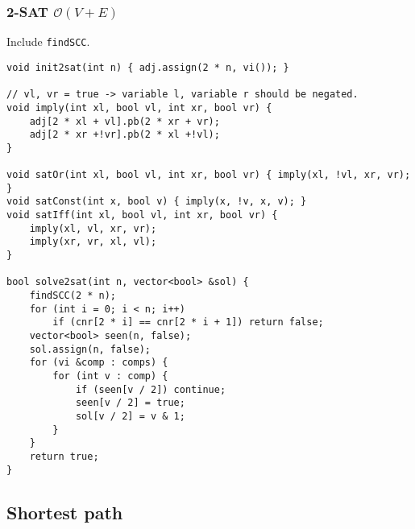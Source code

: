 \documentclass{article}
\begin{document}
\subsubsection{2-SAT $\mathcal{O}(V+E)$}

Include \texttt{findSCC}.

\begin{lstlisting}
void init2sat(int n) { adj.assign(2 * n, vi()); }

// vl, vr = true -> variable l, variable r should be negated.
void imply(int xl, bool vl, int xr, bool vr) {
	adj[2 * xl + vl].pb(2 * xr + vr);
	adj[2 * xr +!vr].pb(2 * xl +!vl);
}

void satOr(int xl, bool vl, int xr, bool vr) { imply(xl, !vl, xr, vr); }
void satConst(int x, bool v) { imply(x, !v, x, v); }
void satIff(int xl, bool vl, int xr, bool vr) {
	imply(xl, vl, xr, vr);
	imply(xr, vr, xl, vl);
}

bool solve2sat(int n, vector<bool> &sol) {
	findSCC(2 * n);
	for (int i = 0; i < n; i++)
		if (cnr[2 * i] == cnr[2 * i + 1]) return false;
	vector<bool> seen(n, false);
	sol.assign(n, false);
	for (vi &comp : comps) {
		for (int v : comp) {
			if (seen[v / 2]) continue;
			seen[v / 2] = true;
			sol[v / 2] = v & 1;
		}
	}
	return true;
}
\end{lstlisting}

\begin{comment}
\subsection{Cycle Detection $\mathcal{O}(V + E)$}

\begin{lstlisting}
vvi adj; // assumes bidirected graph, adjust accordingly
vector<bool> vis(MAXN, false);
vi par(MAXN, -1);

bool cycle_detection() {
	stack<int> s;
	s.push(0);
	vis[0] = true;
	while(!s.empty()) {
		int cur = s.top();
		s.pop();
		for(int i : adj[cur]) {
			if(vis[i] && par[cur] != i) return true;
			s.push(i);
			par[i] = cur;
			vis[i] = true;
		}
	}
	return false;
}
\end{lstlisting}
\end{comment}

\subsection{Shortest path}
\end{document}
